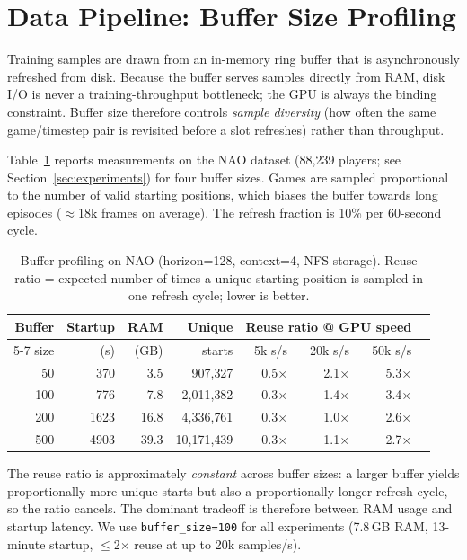 \appendix

\section{Data Pipeline: Buffer Size Profiling}
\label{app:buffer-profiling}

Training samples are drawn from an in-memory ring buffer that is asynchronously
refreshed from disk.  Because the buffer serves samples directly from RAM, disk
I/O is never a training-throughput bottleneck; the GPU is always the binding
constraint.  Buffer size therefore controls \emph{sample diversity} (how often
the same game/timestep pair is revisited before a slot refreshes) rather than
throughput.

Table~\ref{tab:buffer-profile} reports measurements on the NAO dataset
(88{,}239 players; see Section~\ref{sec:experiments}) for four buffer sizes.
Games are sampled proportional to the number of valid starting positions, which
biases the buffer towards long episodes ($\approx$18k frames on average).
The refresh fraction is 10\% per 60-second cycle.

\begin{table}[h]
\centering
\caption{Buffer profiling on NAO (horizon=128, context=4, NFS storage).
Reuse ratio = expected number of times a unique starting position is
sampled in one refresh cycle; lower is better.}
\label{tab:buffer-profile}
\begin{tabular}{rrrr rrrr}
\toprule
Buffer & Startup & RAM & Unique & \multicolumn{3}{c}{Reuse ratio @ GPU speed} \\
\cmidrule(lr){5-7}
size & (s) & (GB) & starts & 5k s/s & 20k s/s & 50k s/s \\
\midrule
  50 &  370 &  3.5 &    907{,}327 & 0.5$\times$ & 2.1$\times$ & 5.3$\times$ \\
 100 &  776 &  7.8 &  2{,}011{,}382 & 0.3$\times$ & 1.4$\times$ & 3.4$\times$ \\
 200 & 1623 & 16.8 &  4{,}336{,}761 & 0.3$\times$ & 1.0$\times$ & 2.6$\times$ \\
 500 & 4903 & 39.3 & 10{,}171{,}439 & 0.3$\times$ & 1.1$\times$ & 2.7$\times$ \\
\bottomrule
\end{tabular}
\end{table}

The reuse ratio is approximately \emph{constant} across buffer sizes: a larger
buffer yields proportionally more unique starts but also a proportionally longer
refresh cycle, so the ratio cancels.  The dominant tradeoff is therefore between
RAM usage and startup latency.  We use \texttt{buffer\_size=100} for all
experiments (7.8\,GB RAM, 13-minute startup, ${\le}$2$\times$ reuse at up to
20k samples/s).

